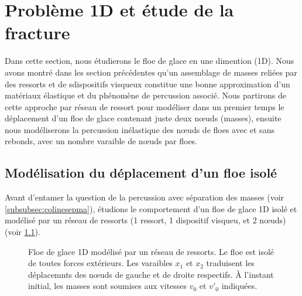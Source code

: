 
\chapter{Problème 1D et étude de la fracture} %

\label{Chapter3} %





Dans cette section, nous étudierons le floe de glace en une dimention (1D). Nous avons montré dans les section précédentes qu'un assemblage de masses reliées par des ressorts et de sdispositifs visqueux constitue une bonne approximation d'un matériaux élastique et du phénomène de percussion associé. Nous partirons de cette approche par réseau de ressort pour modéliser dans un premier temps le déplacement d'un floe de glace contenant juste deux n\oe{}uds (masses), ensuite nous modéliserons la percussion inélastique des n\oe{}uds de floes avec et sans rebonds, avec un nombre varaible de n\oe{}uds par floes. 





\section{Modélisation du déplacement d'un floe isolé}
\label{subsubsec:moddep1D}


Avant d'entamer la question de la percussion avec séparation des masses (voir \cref{subsubsec:colinesepma}), étudions le comportement d'un floe de glace 1D isolé et modélisé par un réseau de ressorts (1 ressort, 1 dispositif visqueu, et 2 n\oe{}uds) (voir \cref{fig:deplacement1d}).
\begin{figure}[!h]
    \centering
    \caption{Floe de glace 1D modélisé par un réseau de ressorts. Le floe est isolé de toutes forces extérieurs. Les varaibles $x_1$ et $x_2$ traduisent les déplacemnts des n\oe{}uds de gauche et de droite respectifs. À l'instant initial, les masses sont soumises aux vitesses $v_0$ et $v'_0$ indiquées.}
    \label{fig:deplacement1d}
\end{figure}


